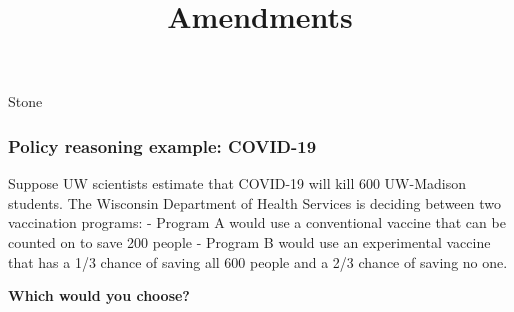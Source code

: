 \documentclass[aspectratio=169]{beamer}
\title{Amendments}
\date{}
\theoremstyle{principle}
\begin{document}


{
  \begin{frame}[plain]
  
\begin{mdframed}[tikzsetting={draw=black,fill=white,fill opacity=0.7,
               line width=0pt},backgroundcolor=none,leftmargin=20,
               rightmargin=20,innertopmargin=4pt]
\Huge Stone
\end{mdframed}

  \end{frame}
}

%
%
%

\begin{frame}
\frametitle{Policy reasoning example: COVID-19}

Suppose UW scientists estimate that COVID-19 will kill 600 UW-Madison students. The Wisconsin Department of Health Services is deciding between two vaccination programs: - Program A would use a conventional vaccine that can be counted on to save 200 people - Program B would use an experimental vaccine that has a 1/3 chance of saving all 600 people and a 2/3 chance of saving no one.\\
\bigskip
\bigskip
\begin{center}
\textbf{Which would you choose?}
\end{center}
\end{frame}
\end{document}
